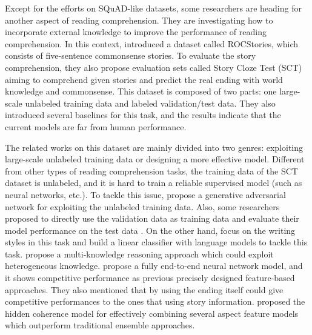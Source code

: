 \documentclass[letterpaper]{article} %
\begin{document}
Except for the efforts on SQuAD-like datasets, some researchers are heading for another aspect of reading comprehension.
They are investigating how to incorporate external knowledge to improve the performance of reading comprehension. 
In this context, \citeauthor{mostafazadeh-etal-2016}  introduced a dataset called ROCStories, which consists of five-sentence commonsense stories. To evaluate the story comprehension, they also propose evaluation sets called Story Cloze Test (SCT) aiming to comprehend given stories and predict the real ending with world knowledge and commonsense. 
This dataset is composed of two parts: one large-scale unlabeled training data and labeled validation/test data.
They also introduced several baselines for this task, and the results indicate that the current models are far from human performance. 

The related works on this dataset are mainly divided into two genres: exploiting large-scale unlabeled training data or designing a more effective model.
Different from other types of reading comprehension tasks, the training data of the SCT dataset is unlabeled, and it is hard to train a reliable supervised model (such as neural networks, etc.). 
To tackle this issue, \citeauthor{bingning-etal-2017}  propose a generative adversarial network for exploiting the unlabeled training data.
Also, some researchers proposed to directly use the validation data as training data and evaluate their model performance on the test data \cite{cai-etal-2017,chaturvedi-etal-2017}.
On the other hand, \citeauthor{schwartz-etal-2017}  focus on the writing styles in this task and build a linear classifier with language models to tackle this task. 
\citeauthor{lin-etal-2017}  propose a multi-knowledge reasoning approach which could exploit heterogeneous knowledge.
\citeauthor{cai-etal-2017}  propose a fully end-to-end neural network model, and it shows competitive performance as previous precisely designed feature-based approaches. They also mentioned that by using the ending itself could give competitive performances to the ones that using story information.
\citeauthor{chaturvedi-etal-2017}  proposed the hidden coherence model for effectively combining several aspect feature models which outperform traditional ensemble approaches.
\end{document}
